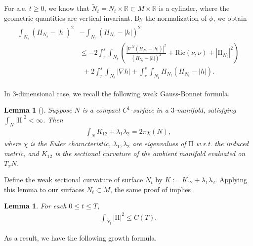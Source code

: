 \documentclass[11pt, letterpaper]{amsart}
\newtheorem{lem}[thm]{Lemma}
\theoremstyle{definition}
\theoremstyle{remark}
\begin{document}
For a.e. $t \geq 0$, we know that $\tilde{N}_{t} = N_{t} \times \mathbb{R} \subset M \times \mathbb{R}$ is a cylinder, where the geometric quantities are vertical invariant. By the normalization of $\phi $, we obtain
\begin{align}\label{monotone-H-h-1}
	\begin{split}
		\int_{N_s}  (H_{N_s} - |h| )^2 & - \int_{{N}_r}  (H_{{N}_r} - |h| )^2 \\
								   &\leq - 2 \int_{r}^{s} \int_{{N}_t}  \left( \frac{|{\nabla }^{N} (H_{{N}_t} -|h|)|^2}{(H_{{N}_t} - |h|)^2} + \mathrm{Ric}({\nu }, {\nu }) + |\mathrm{II}_{{N}_t}|^2 \right) \\
								   &\ \ + 2 \int_{r}^{s} \int_{{N}_{t}}  |\nabla h| + \int_{r}^{s} \int_{{N}_t}  H_{{N}_t}(H_{{N}_t} - |h|).
	\end{split}
\end{align} 


In $3$-dimensional case, we recall the following weak Gauss-Bonnet formula.
\begin{lem}[{\cite[Lemma 5.4]{HI01}}]\label{lem-weak-Gauss-Bonnet}
	Suppose $N$ is a compact $C^1$-surface in a $3$-manifold, satisfying $\int_{N}|\mathrm{II}|^2< \infty$. Then
	\begin{align*}
		\int_{N} K_{12}+ \lambda _1 \lambda _2 = 2 \pi \chi (N),
	\end{align*}
	where $\chi $ is the Euler characteristic, $\lambda _1, \lambda _2$ are eigenvalues of $\mathrm{II}$ w.r.t. the induced metric, and $K_{12}$ is the sectional curvature of the ambient manifold evaluated on $T_xN$.
\end{lem}
Define the weak sectional curvature of surface $N_t$ by $K:= K_{12}+ \lambda _1 \lambda _2$. Applying this lemma to our surfaces $N_t \subset M$, the same proof of {\cite[Lemma 5.5]{HI01}} implies
\begin{lem}\label{lem-W22-Nt}
For each $0\leq t \leq T$, 
\begin{align*}
	\int_{N_t} |\mathrm{II}|^2 \leq C(T).
\end{align*} 
\end{lem}



As a result, we have the following growth formula.
\end{document}
